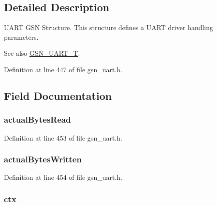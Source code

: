 \subsection{Detailed Description}
UART GSN Structure. This structure defines a UART driver handling parameters. 

\begin{DoxySeeAlso}{See also}
\hyperlink{a00656_gacd6ebb3a4883ec781b873a90dbed102a}{GSN\_\-UART\_\-T}. 
\end{DoxySeeAlso}


Definition at line 447 of file gsn\_\-uart.h.



\subsection{Field Documentation}
\hypertarget{a00263_a2bbf2fcbc8e54eea4413aa5214f4e0aa}{
\subsubsection[{actualBytesRead}]{ {\bf actualBytesRead}}}
\label{a00263_a2bbf2fcbc8e54eea4413aa5214f4e0aa}


Definition at line 453 of file gsn\_\-uart.h.

\hypertarget{a00263_acaadb3f45d67507c5f8f58ab6df0a970}{
\subsubsection[{actualBytesWritten}]{ {\bf actualBytesWritten}}}
\label{a00263_acaadb3f45d67507c5f8f58ab6df0a970}


Definition at line 454 of file gsn\_\-uart.h.

\hypertarget{a00263_a22dc5420bfc134c3b3292f60fda39120}{
\subsubsection[{ctx}]{ {\bf ctx}}}
\label{a00263_a22dc5420bfc134c3b3292f60fda39120}


